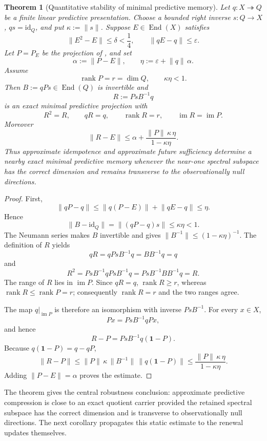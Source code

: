 \documentclass[11pt]{article}
\newtheorem{theorem}{Theorem}[section]
\theoremstyle{definition}
\theoremstyle{remark}
\newcommand{\one}{\mathbf 1}
\newcommand{\id}{\mathrm{id}}
\newcommand{\rank}{\operatorname{rank}}
\newcommand{\End}{\operatorname{End}}
\newcommand{\norm}[1]{\lVert#1\rVert}
\begin{document}
\begin{theorem}[Quantitative stability of minimal predictive memory]
\label{thm:predictive-compression-stability}
Let \(q:X\twoheadrightarrow Q\) be a finite linear predictive presentation.
Choose a bounded right inverse \(s:Q\to X\), \(qs=\id_Q\), and put
\(\kappa:=\norm{s}\).  Suppose \(E\in\End(X)\) satisfies
\[
 \norm{E^2-E}\le\delta<\frac14,\qquad
 \norm{qE-q}\le\varepsilon.
\]
Let \(P=P_E\) be the projection of
, and set
\[
 \alpha:=\norm{P-E},\qquad
 \eta:=\varepsilon+\norm q\,\alpha.
\]
Assume
\[
 \rank P=r=\dim Q,\qquad \kappa\eta<1.
\]
Then \(B:=qPs\in\End(Q)\) is invertible and
\[
 \boxed{R:=PsB^{-1}q}
\]
is an exact minimal predictive projection with
\[
 R^2=R,\qquad qR=q,\qquad
 \rank R=r,\qquad \operatorname{im}R=\operatorname{im}P.
\]
Moreover
\[
 \boxed{
 \norm{R-E}
 \le
 \alpha+
 \frac{\norm P\,\kappa\,\eta}{1-\kappa\eta}.}
\]
Thus approximate idempotence and approximate future sufficiency determine a
nearby exact minimal predictive memory whenever the near-one spectral
subspace has the correct dimension and remains transverse to the
observationally null directions.
\end{theorem}

\begin{proof}
First,
\[
 \norm{qP-q}
 \le \norm{q(P-E)}+\norm{qE-q}
 \le\eta.
\]
Hence
\[
 \norm{B-\id_Q}
 =\norm{(qP-q)s}
 \le\kappa\eta<1.
\]
The Neumann series makes \(B\) invertible and gives
\(\norm{B^{-1}}\le(1-\kappa\eta)^{-1}\).  The definition of \(R\) yields
\[
 qR=qPsB^{-1}q=BB^{-1}q=q
\]
and
\[
 R^2
 =PsB^{-1}qPsB^{-1}q
 =PsB^{-1}BB^{-1}q
 =R.
\]
The range of \(R\) lies in \(\operatorname{im}P\).  Since \(qR=q\),
\(\rank R\ge r\), whereas \(\rank R\le\rank P=r\); consequently
\(\rank R=r\) and the two ranges agree.

The map \(q|_{\operatorname{im}P}\) is therefore an isomorphism with inverse
\(PsB^{-1}\).  For every \(x\in X\),
\[
 Px=PsB^{-1}qPx,
\]
and hence
\[
 R-P=PsB^{-1}q(\one-P).
\]
Because \(q(\one-P)=q-qP\),
\[
 \norm{R-P}
 \le
 \norm P\,\kappa\,\norm{B^{-1}}\,\norm{q(\one-P)}
 \le
 \frac{\norm P\,\kappa\,\eta}{1-\kappa\eta}.
\]
Adding \(\norm{P-E}=\alpha\) proves the estimate.
\end{proof}

The theorem gives the central robustness conclusion: approximate predictive
compression is close to an exact quotient carrier provided the retained spectral
subspace has the correct dimension and is transverse to observationally null
directions.  The next corollary propagates this static estimate to the renewal
updates themselves.
\end{document}
